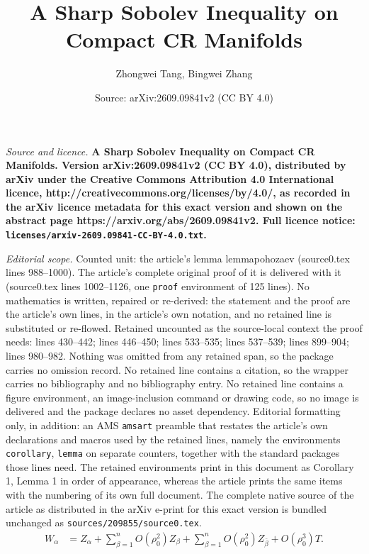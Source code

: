 \documentclass[10pt,a4paper]{amsart}
\title{\bf A Sharp Sobolev Inequality on Compact CR Manifolds}
\author{Zhongwei Tang, Bingwei Zhang}
\date{Source: arXiv:2609.09841v2 (CC BY 4.0)}
\begin{document}
\maketitle

\noindent\emph{Source and licence.} \bf A Sharp Sobolev Inequality on Compact CR Manifolds. Version arXiv:2609.09841v2 (CC BY 4.0), distributed by arXiv under the Creative Commons Attribution 4.0 International licence, http://creativecommons.org/licenses/by/4.0/, as recorded in the arXiv licence metadata for this exact version and shown on the abstract page https://arxiv.org/abs/2609.09841v2. Full licence notice: \texttt{licenses/arxiv-2609.09841-CC-BY-4.0.txt}.\par\smallskip

\noindent\textit{Editorial scope.} Counted unit: the article's lemma lemmapohozaev (source0.tex lines 988--1000). The article's complete original proof of it is delivered with it (source0.tex lines 1002--1126, one \texttt{proof} environment of 125 lines). No mathematics is written, repaired or re-derived: the statement and the proof are the article's own lines, in the article's own notation, and no retained line is substituted or re-flowed.  Retained uncounted as the source-local context the proof needs: lines 430--442; lines 446--450; lines 533--535; lines 537--539; lines 899--904; lines 980--982.  Nothing was omitted from any retained span, so the package carries no omission record.  No retained line contains a citation, so the wrapper carries no bibliography and no bibliography entry.  No retained line contains a figure environment, an image-inclusion command or drawing code, so no image is delivered and the package declares no asset dependency.  Editorial formatting only, in addition: an AMS \texttt{amsart} preamble that restates the article's own declarations and macros used by the retained lines, namely the environments \texttt{corollary}, \texttt{lemma} on separate counters, together with the standard packages those lines need.  The retained environments print in this document as Corollary 1, Lemma 1 in order of appearance, whereas the article prints the same items with the numbering of its own full document.  The complete native source of the article as distributed in the arXiv e-print for this exact version is bundled unchanged as \texttt{sources/209855/source0.tex}.
\begin{equation}\label{eq:JL-frame-comparison}
\begin{aligned}
W_\alpha
&=
Z_\alpha
+
\sum_{\beta=1}^n O(\rho_0^2)Z_\beta
+
\sum_{\beta=1}^n O(\rho_0^2)Z_{\bar\beta}
+
O(\rho_0^3)T .
\end{aligned}
\end{equation}
\end{document}
